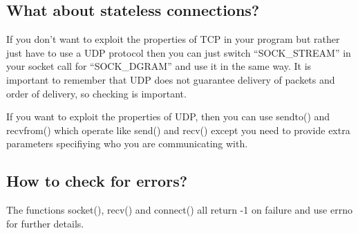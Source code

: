 \subsection{What about stateless connections?}
If you don't want to exploit the properties of TCP in your program but rather
just have to use a UDP protocol then you can just switch ``SOCK\_STREAM'' in
your socket call for ``SOCK\_DGRAM'' and use it in the same way. It is
important to remember that UDP does not guarantee delivery of packets and order
of delivery, so checking is important.

If you want to exploit the properties of UDP, then you can use sendto() and
recvfrom() which operate like send() and recv() except you need to provide
extra parameters specifiying who you are communicating with.

\subsection{How to check for errors?}
The functions socket(), recv() and connect() all return -1 on failure and use
errno for further details.
